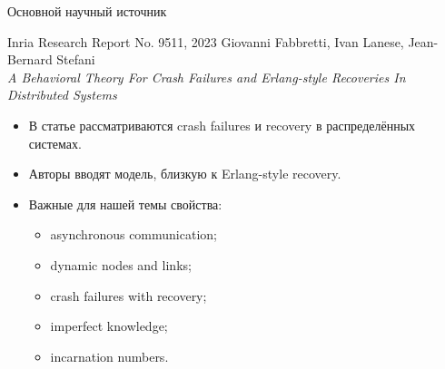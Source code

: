 \begin{frame}{Основной научный источник}
	\begin{block}{Inria Research Report No. 9511, 2023}
		Giovanni Fabbretti, Ivan Lanese, Jean-Bernard Stefani\\
		\textit{A Behavioral Theory For Crash Failures and Erlang-style Recoveries In Distributed Systems}	
	\end{block}
	
	\begin{itemize}
		\item В статье рассматриваются crash failures и recovery в распределённых системах.
		\item Авторы вводят модель, близкую к Erlang-style recovery.
		\item Важные для нашей темы свойства:
		\begin{itemize}
			\item asynchronous communication;
			\item dynamic nodes and links;
			\item crash failures with recovery;
			\item imperfect knowledge;
			\item incarnation numbers.
		\end{itemize}
	\end{itemize}
\end{frame}